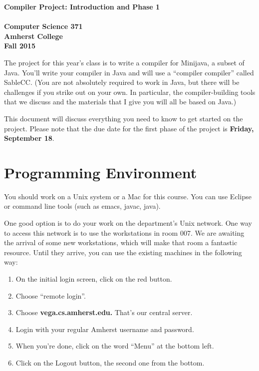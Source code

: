\documentclass[11pt]{article}
\begin{document}
\begin{center}
\Large \bf Compiler Project:  Introduction and Phase 1 \\ \mbox{} \\
\large Computer Science 371 \\
\large Amherst College \\
\large Fall 2015
\end{center}

The project for this year's class is to write a compiler for Minijava, a subset of Java.  You'll write your compiler in Java and will use a ``compiler compiler'' called SableCC.  (You are not absolutely required to work in Java, but there will be challenges if you strike out on your own.  In particular, the compiler-building tools that we discuss and the materials that I give you will all be based on Java.)

This document will discuss everything you need to know to get started on the project.  Please note that the due date for the first phase of the project is {\bf Friday, September 18}.

\section{Programming Environment}

You should work on a Unix system or a Mac for this course. You can use Eclipse or command line tools (such as emacs, javac, java).

One good option is to do your work on the department's Unix network. One way to access this network is to use the workstations in room 007. We are awaiting the arrival of some new workstations, which will make that room a fantastic resource. Until they arrive, you can use the existing machines in the following way:
\begin{enumerate}
\item On the initial login screen, click on the red button.
\item Choose ``remote login''.
\item Choose {\bf vega.cs.amherst.edu.} That's our central server.
\item Login with your regular Amherst username and password.
\item When you're done, click on the word ``Menu'' at the bottom left.
\item Click on the Logout button, the second one from the bottom.
\end{enumerate}
\end{document}
